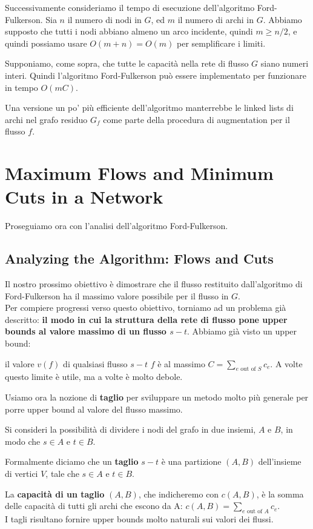 Successivamente consideriamo il tempo di esecuzione dell'algoritmo
Ford-Fulkerson. Sia $n$ il numero di nodi in $G$, ed $m$ il numero
di archi in $G$. Abbiamo supposto che tutti i nodi abbiano almeno un
arco incidente, quindi $m \ge n/2$, e quindi possiamo usare
$O(m + n ) = O(m)$ per semplificare i limiti.

\begin{myblockquote}
	Supponiamo, come sopra, che tutte le capacità nella rete di flusso $G$
	siano numeri interi. Quindi l'algoritmo Ford-Fulkerson può essere
	implementato per funzionare in tempo $O(mC)$.
\end{myblockquote}

Una versione un po' più efficiente dell'algoritmo manterrebbe le linked
lists di archi nel grafo residuo $G_f$ come parte della procedura di
augmentation per il flusso $f$.


\section{Maximum Flows and Minimum Cuts in a Network}

Proseguiamo ora con l'analisi dell'algoritmo Ford-Fulkerson.


\subsection{Analyzing the Algorithm: Flows and Cuts}

Il nostro prossimo obiettivo è dimostrare che il flusso restituito
dall'algoritmo di Ford-Fulkerson ha il massimo valore possibile per il
flusso in $G$.\\

Per compiere progressi verso questo obiettivo, torniamo ad un problema
già descritto: \textbf{il modo in cui la struttura della rete di flusso
	pone upper bounds al valore massimo di un flusso $s-t$}. Abbiamo già
visto un upper bound:

\begin{myblockquote}
	il valore $v(f)$ di qualsiasi
	flusso $s-t$ $f$ è al massimo
	$C = \sum_{e \text{ out of } S} c_e$. A volte questo limite è utile,
	ma a volte è molto debole.
\end{myblockquote}

Usiamo ora la nozione di \textbf{taglio} per sviluppare un metodo molto
più generale per porre upper bound al valore del flusso massimo.

\begin{myblockquote}
	Si consideri la possibilità di dividere i nodi del grafo
	in due insiemi, $A$ e $B$, in modo che $s \in A$ e $t \in B$.

	Formalmente diciamo che un \textbf{taglio} $s-t$ è una
	partizione $(A, B)$ dell'insieme di vertici $V$, tale che
	$s \in A$ e $t \in B$.

	La \textbf{capacità di un taglio} $(A, B)$, che indicheremo con $c(A , B)$, è la somma delle
	capacità di tutti gli archi che escono da A:
	$
		c(A, B) = \sum_{e \text{ out of } A} c_e.
	$\\
	I tagli risultano fornire upper bounds molto naturali sui valori dei flussi.
\end{myblockquote}

